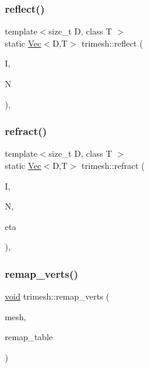 \subsubsection{\texorpdfstring{reflect()}{reflect()}}
{\footnotesize\ttfamily template$<$size\+\_\+t D, class T $>$ \\
static \hyperlink{classtrimesh_1_1Vec}{Vec}$<$D,T$>$ trimesh\+::reflect (\begin{DoxyParamCaption}\item[{const \hyperlink{classtrimesh_1_1Vec}{Vec}$<$ D, T $>$ \&}]{I,  }\item[{const \hyperlink{classtrimesh_1_1Vec}{Vec}$<$ D, T $>$ \&}]{N }\end{DoxyParamCaption})\hspace{0.3cm}{\ttfamily [inline]}, {\ttfamily [static]}}

\mbox{\label{namespacetrimesh_a14ff2a88c7132b9a6a114843d41ca221}} 
\subsubsection{\texorpdfstring{refract()}{refract()}}
{\footnotesize\ttfamily template$<$size\+\_\+t D, class T $>$ \\
static \hyperlink{classtrimesh_1_1Vec}{Vec}$<$D,T$>$ trimesh\+::refract (\begin{DoxyParamCaption}\item[{const \hyperlink{classtrimesh_1_1Vec}{Vec}$<$ D, T $>$ \&}]{I,  }\item[{const \hyperlink{classtrimesh_1_1Vec}{Vec}$<$ D, T $>$ \&}]{N,  }\item[{const T \&}]{eta }\end{DoxyParamCaption})\hspace{0.3cm}{\ttfamily [inline]}, {\ttfamily [static]}}

\mbox{\label{namespacetrimesh_a29dccece938acddbc2a3e29ae1c59ab3}} 
\subsubsection{\texorpdfstring{remap\+\_\+verts()}{remap\_verts()}\hspace{0.1cm}{\footnotesize\ttfamily [1/2]}}
{\footnotesize\ttfamily \hyperlink{namespacetrimesh_a784ddfd979e1c579bda795a8edfc3f43}{void} trimesh\+::remap\+\_\+verts (\begin{DoxyParamCaption}\item[{\hyperlink{classtrimesh_1_1TriMesh}{Tri\+Mesh} $\ast$}]{mesh,  }\item[{const std\+::vector$<$ int $>$ \&}]{remap\+\_\+table }\end{DoxyParamCaption})}



